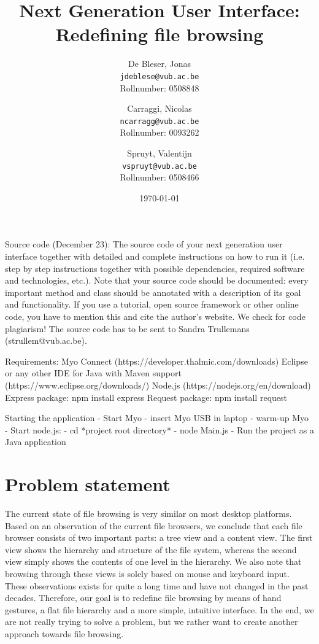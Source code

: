 \documentclass{article}
\title{Next Generation User Interface: \\Redefining file browsing}
\author{
  De Bleser, Jonas\\
  \texttt{jdeblese@vub.ac.be}\\
  Rollnumber: 0508848
  \and
  Carraggi, Nicolas\\
  \texttt{ncarragg@vub.ac.be}\\
  Rollnumber: 0093262
  \and
  Spruyt, Valentijn\\
  \texttt{vspruyt@vub.ac.be}\\
  Rollnumber: 0508466
}
\date{\today}
\begin{document}
\maketitle

Source code (December 23): The source code of your next generation user interface together with
detailed and complete instructions on how to run it (i.e. step by step instructions together with possible
dependencies, required software and technologies, etc.). Note that your source code should be
documented: every important method and class should be annotated with a description of its goal and
functionality. If you use a tutorial, open source framework or other online code, you have to mention
this and cite the author’s website. We check for code plagiarism! The source code has to be sent to
Sandra Trullemans (strullem@vub.ac.be).

Requirements:
Myo Connect (https://developer.thalmic.com/downloads)
Eclipse or any other IDE for Java with Maven support (https://www.eclipse.org/downloads/)
Node.js (https://nodejs.org/en/download)
	Express package: npm install express
	Request package: npm install request

Starting the application
- Start Myo
	- insert Myo USB in laptop
	- warm-up Myo
- Start node.js: 
	- cd *project root directory*
	- node Main.js
- Run the project as a Java application



\tableofcontents

\section{Problem statement}
The current state of file browsing is very similar on most desktop platforms. Based on an observation of the current file browsers, we conclude that each file browser consists of two important parts: a tree view and a content view. The first view shows the hierarchy and structure of the file system, whereas the second view simply shows the contents of one level in the hierarchy.  We also note that browsing through these views is solely based on mouse and keyboard input. These observations exists for quite a long time and have not changed in the past decades. Therefore, our goal is to redefine file browsing by means of hand gestures, a flat file hierarchy and a more simple, intuitive interface. In the end, we are not really trying to solve a problem, but we rather want to create another approach towards file browsing.
\end{document}
